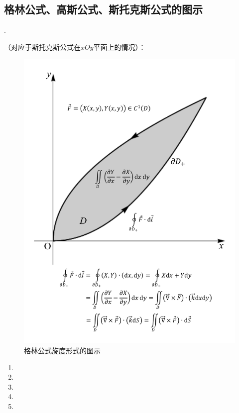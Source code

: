 \documentclass[12pt,UTF8,fleqn]{ctexart}
\begin{document}
\subsection{格林公式、高斯公式、斯托克斯公式的图示}
\begin{enumerate}
.
\begin{enumerate}
（对应于斯托克斯公式在$xOy$平面上的情况）：
\begin{figure}[H]
\begin{center}
\includegraphics[height=0.618\textheight,angle=0]{Figures20190613/Green.pdf}
\end{center}
\caption{格林公式旋度形式的图示}
\end{figure}
\begin{enumerate}
\item[]
\item[]
\item[]
\item[]
\item[]

\end{enumerate}
\end{enumerate}
\end{enumerate}
\end{document}
